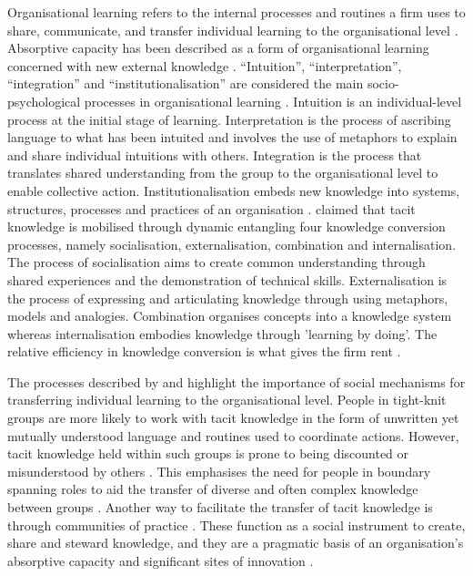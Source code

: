 Organisational learning refers to the internal processes and routines a firm uses to share, communicate, and transfer individual learning to the organisational level \citep{vera2000organizational}. Absorptive capacity has been described as a form of organisational learning concerned with new external knowledge \citep{sun2010examination}. \enquote{Intuition}, \enquote{interpretation}, \enquote{integration} and \enquote{institutionalisation} are considered the main socio-psychological processes in organisational learning \citep{crossan1999organizational}. Intuition is an individual-level process at the initial stage of learning. Interpretation is the process of ascribing language to what has been intuited and involves the use of metaphors to explain and share individual intuitions with others. Integration is the process that translates shared understanding from the group to the organisational level to enable collective action. Institutionalisation embeds new knowledge into systems, structures, processes and practices of an organisation \citep{crossan1999organizational}. \citet{nonaka1995knowledge} claimed that tacit knowledge is mobilised through dynamic entangling four knowledge conversion processes, namely socialisation, externalisation, combination and internalisation. The process of socialisation aims to create common understanding through shared experiences and the demonstration of technical skills. Externalisation is the process of expressing and articulating knowledge through using metaphors, models and analogies. Combination organises concepts into a knowledge system whereas internalisation embodies knowledge through 'learning by doing'. The relative efficiency in knowledge conversion is what gives the firm rent \citep{nonaka1994dynamic,nonaka1995knowledge}. \medskip

The processes described by \citet{nonaka1995knowledge} and \citet{crossan1999organizational} highlight the importance of social mechanisms for transferring individual learning to the organisational level. People in tight-knit groups are more likely to work with tacit knowledge in the form of unwritten yet mutually understood language and routines used to coordinate actions. However, tacit knowledge held within such groups is prone to being discounted or misunderstood by others \citep{burt2007secondhand}. This emphasises the need for people in boundary spanning roles to aid the transfer of diverse and often complex knowledge between groups \citep{tushman1981boundary,allen1984managing,szulanski2003sticky,seidler2008use,meyer2010rise,chesbrough2012open}. Another way to facilitate the transfer of tacit knowledge is through communities of practice \citep{lave1991situated,brown2001knowledge,smith2001role,cox2005communities,easterby2008inter}. These function as a social instrument to create, share and steward knowledge, and they are a pragmatic basis of an organisation’s absorptive capacity and significant sites of innovation \citep{brown1991organizational}. \medskip


